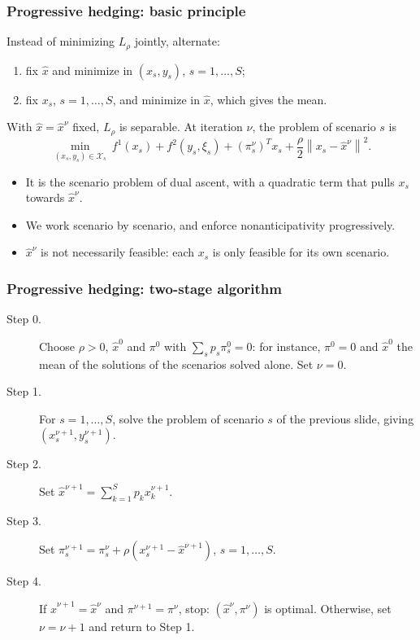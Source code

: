 \documentclass[aspectratio=169]{beamer}
\def\cX{\mathcal{X}}
\begin{document}
\begin{frame}
\frametitle{Progressive hedging: basic principle}

Instead of minimizing $L_\rho$ jointly, alternate:
\begin{enumerate}
\item
fix $\hat{x}$ and minimize in $(x_s, y_s)$, $s = 1,\ldots,S$;
\item
fix $x_s$, $s = 1,\ldots,S$, and minimize in $\hat{x}$, which gives the mean.
\end{enumerate}

\mbox{}

With $\hat{x} = \hat{x}^{\nu}$ fixed, $L_\rho$ is separable. At iteration $\nu$, the problem of scenario $s$ is
\[
\min_{(x_s, y_s) \in \cX_s}\ f^1(x_s) + f^2(y_s,\xi_s) + \left(\pi_s^{\nu}\right)^T x_s + \frac{\rho}{2}\left\| x_s-\hat{x}^{\nu} \right\|^2.
\]
\begin{itemize}
\item
It is the scenario problem of dual ascent, with a quadratic term that pulls $x_s$ towards $\hat{x}^{\nu}$.
\item
We work scenario by scenario, and enforce nonanticipativity progressively.
\item
$\hat{x}^{\nu}$ is not necessarily feasible: each $x_s$ is only feasible for its own scenario.
\end{itemize}

\end{frame}

\begin{frame}
\frametitle{Progressive hedging: two-stage algorithm}

\begin{description}
\item[Step 0.]
Choose $\rho > 0$, $\hat{x}^0$ and $\pi^0$ with $\sum_s p_s \pi_s^0 = 0$: for instance, $\pi^0 = 0$ and $\hat{x}^0$ the mean of the solutions of the scenarios solved alone. Set $\nu = 0$.
\item[Step 1.]
For $s = 1,\ldots,S$, solve the problem of scenario $s$ of the previous slide, giving $\left(x_s^{\nu+1}, y_s^{\nu+1}\right)$.
\item[Step 2.]
Set $\hat{x}^{\nu+1} = \sum_{k=1}^S p_k x_k^{\nu+1}$.
\item[Step 3.]
Set $\pi^{\nu+1}_s = \pi^{\nu}_s + \rho \left(x_s^{\nu+1}-\hat{x}^{\nu+1}\right)$, $s = 1,\ldots{}, S$.
\item[Step 4.]
If $\hat{x}^{\nu+1} = \hat{x}^{\nu}$ and $\pi^{\nu+1} = \pi^{\nu}$,
stop: $(\hat{x}^{\nu}, \pi^{\nu})$ is optimal.
Otherwise, set $\nu = \nu+1$ and return to Step 1.
\end{description}

\end{frame}
\end{document}
